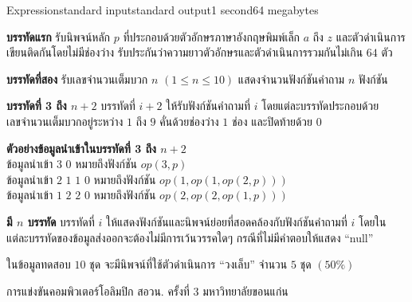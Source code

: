 \documentclass[11pt,a4paper]{article}
\begin{document}
\begin{problem}{Expression}{standard input}{standard output}{1 second}{64 megabytes}
\InputFile

\textbf{บรรทัดแรก} รับนิพจน์หลัก $p$ ที่ประกอบด้วยตัวอักษรภาษาอังกฤษพิมพ์เล็ก $a$ ถึง $z$ และตัวดำเนินการเขียนติดกันโดยไม่มีช่องว่าง รับประกันว่าความยาวตัวอักษรและตัวดำเนินการรวมกันไม่เกิน $64$ ตัว

\textbf{บรรทัดที่สอง} รับเลขจำนวนเต็มบวก $n$ $(1 \leq n \leq 10)$ แสดงจำนวนฟังก์ชันคำถาม $n$ ฟังก์ชัน

\textbf{บรรทัดที่ 3 ถึง $n+2$} บรรทัดที่ $i+2$ ให้รับฟังก์ชันคำถามที่ $i$ โดยแต่ละบรรทัดประกอบด้วยเลขจำนวนเต็มบวกอยู่ระหว่าง $1$ ถึง $9$ คั่นด้วยช่องว่าง $1$ ช่อง และปิดท้ายด้วย $0$

\bigskip
\textbf{ตัวอย่างข้อมูลนำเข้าในบรรทัดที่ 3 ถึง $n+2$} \\
ข้อมูลนำเข้า $3$ $0$ หมายถึงฟังก์ชัน $op(3,p)$\\
ข้อมูลนำเข้า $2$ $1$ $1$ $0$ หมายถึงฟังก์ชัน $op(1,op(1,op(2,p)))$\\
ข้อมูลนำเข้า $1$ $2$ $2$ $0$ หมายถึงฟังก์ชัน $op(2,op(2,op(1,p)))$

\OutputFile

\textbf{มี $n$ บรรทัด} บรรทัดที่ $i$ ให้แสดงฟังก์ชันและนิพจน์ย่อยที่สอดคล้องกับฟังก์ชันคำถามที่ $i$ โดยในแต่ละบรรทัดของข้อมูลส่งออกจะต้องไม่มีการเว้นวรรคใดๆ กรณีที่ไม่มีคำตอบให้แสดง “null”

\Examples

\begin{example}
%
%
%
\end{example}

\Scoring

ในข้อมูลทดสอบ $10$ ชุด จะมีนิพจน์ที่ใช้ตัวดำเนินการ “วงเล็บ” จำนวน $5$ ชุด $(50\%)$

\Source

การแข่งขันคอมพิวเตอร์โอลิมปิก สอวน. ครั้งที่ 3 มหาวิทยาลัยขอนแก่น

\end{problem}
\end{document}
